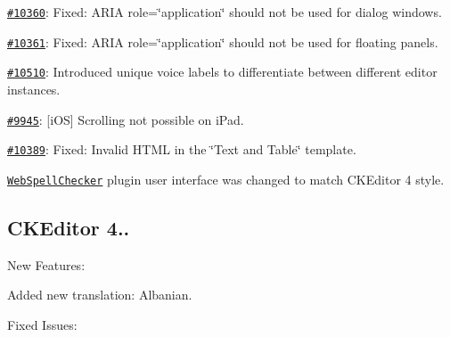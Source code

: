 {\begin{DoxyItemize}
\item \href{http://dev.ckeditor.com/ticket/10360}{\tt \#10360}\+: Fixed\+: A\+R\+IA {\ttfamily role=\char`\"{}application\char`\"{}} should not be used for dialog windows.
\item \href{http://dev.ckeditor.com/ticket/10361}{\tt \#10361}\+: Fixed\+: A\+R\+IA {\ttfamily role=\char`\"{}application\char`\"{}} should not be used for floating panels.
\item \href{http://dev.ckeditor.com/ticket/10510}{\tt \#10510}\+: Introduced unique voice labels to differentiate between different editor instances.
\item \href{http://dev.ckeditor.com/ticket/9945}{\tt \#9945}\+: \mbox{[}i\+OS\mbox{]} Scrolling not possible on i\+Pad.
\item \href{http://dev.ckeditor.com/ticket/10389}{\tt \#10389}\+: Fixed\+: Invalid H\+T\+ML in the \char`\"{}\+Text and Table\char`\"{} template.
\item \href{http://ckeditor.com/addon/wsc}{\tt Web\+Spell\+Checker} plugin user interface was changed to match C\+K\+Editor 4 style.
\end{DoxyItemize}}

{\ttfamily \subsection*{C\+K\+Editor 4..}}

{\ttfamily }

{\ttfamily New Features\+:}

{\ttfamily 
\begin{DoxyItemize}
\item Added new translation\+: Albanian.
\end{DoxyItemize}}

{\ttfamily Fixed Issues\+:}

